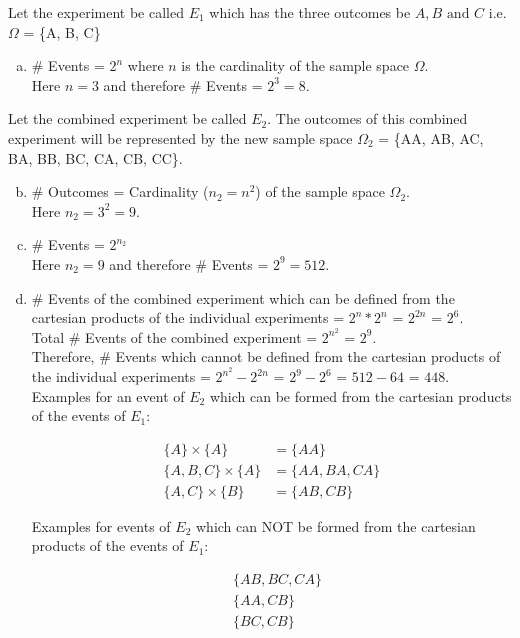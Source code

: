 Let the experiment be called $E_1$ which has the three outcomes be $A, B \text{ and } C$ i.e. $\Omega$ = \{A, B, C\}\\
\begin{enumerate}[a.]
	\item \# Events = $2^n$ where $n$ is the cardinality of the sample space $\Omega$. \\
	Here $n = 3$ and therefore \# Events = $2^3 = 8$.
\end{enumerate}	
	Let the combined experiment be called $E_2$.
	The outcomes of this combined experiment will be represented by the new sample space $\Omega_2$ = \{AA, AB, AC, BA, BB, BC, CA, CB, CC\}.
\begin{enumerate}[a.]\setcounter{enumi}{1}
	\item \# Outcomes = Cardinality ($n_2 = n^2$) of the sample space $\Omega_2$. \\
	Here $n_2 = 3^2 = 9$.
	\item \# Events = $2^{n_2}$ \\
	Here $n_2 = 9$ and therefore \# Events = $2^9 = 512$.
	\item \# Events of the combined experiment which can be defined from the cartesian products of the individual experiments = $2^n * 2^n$ = $2^{2n}$ = $2^6$. \\
	Total \# Events of the combined experiment = $2^{n^2}$ = $2^9$.\\
	Therefore, \# Events which cannot be defined from the cartesian products of the individual experiments = $2^{n^2} - 2^{2n}$ = $2^9 - 2^6$ = $512 - 64$ = $448$.\\[10pt]
	Examples for an event of $E_2$ which can be formed from the cartesian products of the events of $E_1$:
	
	\newcommand\set[1]{\{#1\}}
	
	\begin{align*}
		\set{A} \times \set{A} &= \set{AA} \nonumber\\
		\set{A, B, C} \times \set{A} &= \set{AA, BA, CA} \nonumber\\
		\set{A, C} \times \{B\} &= \set{AB, CB} \nonumber
	\end{align*} 

	Examples for events of $E_2$ which can NOT be formed from the cartesian products of the events of $E_1$:

	\begin{align*}
		& \set{AB, BC, CA} \nonumber\\
		& \set{AA, CB} \nonumber\\
		& \set{BC, CB} \nonumber
	\end{align*} 
	\end{enumerate}	
